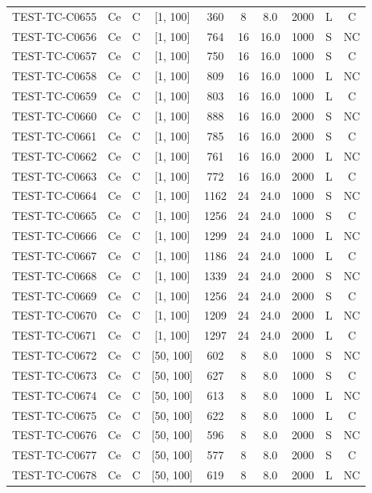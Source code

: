 \begin{longtable}{lccccccccc}
TEST-TC-C0655 & Ce & C & [1, 100] & 360 & 8 & 8.0 & 2000 & L & C \\
TEST-TC-C0656 & Ce & C & [1, 100] & 764 & 16 & 16.0 & 1000 & S & NC \\
TEST-TC-C0657 & Ce & C & [1, 100] & 750 & 16 & 16.0 & 1000 & S & C \\
TEST-TC-C0658 & Ce & C & [1, 100] & 809 & 16 & 16.0 & 1000 & L & NC \\
TEST-TC-C0659 & Ce & C & [1, 100] & 803 & 16 & 16.0 & 1000 & L & C \\
TEST-TC-C0660 & Ce & C & [1, 100] & 888 & 16 & 16.0 & 2000 & S & NC \\
TEST-TC-C0661 & Ce & C & [1, 100] & 785 & 16 & 16.0 & 2000 & S & C \\
TEST-TC-C0662 & Ce & C & [1, 100] & 761 & 16 & 16.0 & 2000 & L & NC \\
TEST-TC-C0663 & Ce & C & [1, 100] & 772 & 16 & 16.0 & 2000 & L & C \\
TEST-TC-C0664 & Ce & C & [1, 100] & 1162 & 24 & 24.0 & 1000 & S & NC \\
TEST-TC-C0665 & Ce & C & [1, 100] & 1256 & 24 & 24.0 & 1000 & S & C \\
TEST-TC-C0666 & Ce & C & [1, 100] & 1299 & 24 & 24.0 & 1000 & L & NC \\
TEST-TC-C0667 & Ce & C & [1, 100] & 1186 & 24 & 24.0 & 1000 & L & C \\
TEST-TC-C0668 & Ce & C & [1, 100] & 1339 & 24 & 24.0 & 2000 & S & NC \\
TEST-TC-C0669 & Ce & C & [1, 100] & 1256 & 24 & 24.0 & 2000 & S & C \\
TEST-TC-C0670 & Ce & C & [1, 100] & 1209 & 24 & 24.0 & 2000 & L & NC \\
TEST-TC-C0671 & Ce & C & [1, 100] & 1297 & 24 & 24.0 & 2000 & L & C \\
TEST-TC-C0672 & Ce & C & [50, 100] & 602 & 8 & 8.0 & 1000 & S & NC \\
TEST-TC-C0673 & Ce & C & [50, 100] & 627 & 8 & 8.0 & 1000 & S & C \\
TEST-TC-C0674 & Ce & C & [50, 100] & 613 & 8 & 8.0 & 1000 & L & NC \\
TEST-TC-C0675 & Ce & C & [50, 100] & 622 & 8 & 8.0 & 1000 & L & C \\
TEST-TC-C0676 & Ce & C & [50, 100] & 596 & 8 & 8.0 & 2000 & S & NC \\
TEST-TC-C0677 & Ce & C & [50, 100] & 577 & 8 & 8.0 & 2000 & S & C \\
TEST-TC-C0678 & Ce & C & [50, 100] & 619 & 8 & 8.0 & 2000 & L & NC \\

\end{longtable}
